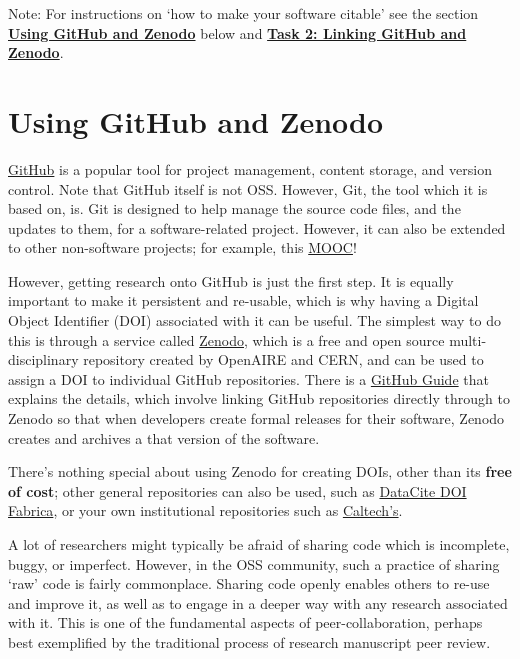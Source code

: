 \documentclass[]{book}
\begin{document}
Note: For instructions on `how to make your software citable' see the section \protect\hyperlink{GitHub_Zenodo}{\textbf{Using GitHub and Zenodo}} below and \href{https://github.com/OpenScienceMOOC/Module-5-Open-Research-Software-and-Open-Source/blob/master/content_development/Task_2.md}{\textbf{Task 2: Linking GitHub and Zenodo}}.

\hypertarget{using-github-and-zenodo}{%
\section{Using GitHub and Zenodo }\label{using-github-and-zenodo}}

\protect\hyperlink{GitHub}{GitHub} is a popular tool for project management, content storage, and version control. Note that GitHub itself is not OSS. However, Git, the tool which it is based on, is. Git is designed to help manage the source code files, and the updates to them, for a software-related project. However, it can also be extended to other non-software projects; for example, this \href{https://github.com/OpenScienceMOOC/}{MOOC}!

However, getting research onto GitHub is just the first step. It is equally important to make it persistent and re-usable, which is why having a Digital Object Identifier (DOI) associated with it can be useful. The simplest way to do this is through a service called \href{https://zenodo.org/}{Zenodo}, which is a free and open source multi-disciplinary repository created by OpenAIRE and CERN, and can be used to assign a DOI to individual GitHub repositories. There is a \href{https://guides.github.com/activities/citable-code/}{GitHub Guide} that explains the details, which involve linking GitHub repositories directly through to Zenodo so that when developers create formal releases for their software, Zenodo creates and archives a that version of the software.

There's nothing special about using Zenodo for creating DOIs, other than its \textbf{free of cost}; other general repositories can also be used, such as \href{https://doi.datacite.org/}{DataCite DOI Fabrica}, or your own institutional repositories such as \href{https://www.library.caltech.edu/news/enhanced-software-preservation-now-available-caltechdata}{Caltech's}.

A lot of researchers might typically be afraid of sharing code which is incomplete, buggy, or imperfect. However, in the OSS community, such a practice of sharing `raw' code is fairly commonplace. Sharing code openly enables others to re-use and improve it, as well as to engage in a deeper way with any research associated with it. This is one of the fundamental aspects of peer-collaboration, perhaps best exemplified by the traditional process of research manuscript peer review.
\end{document}

